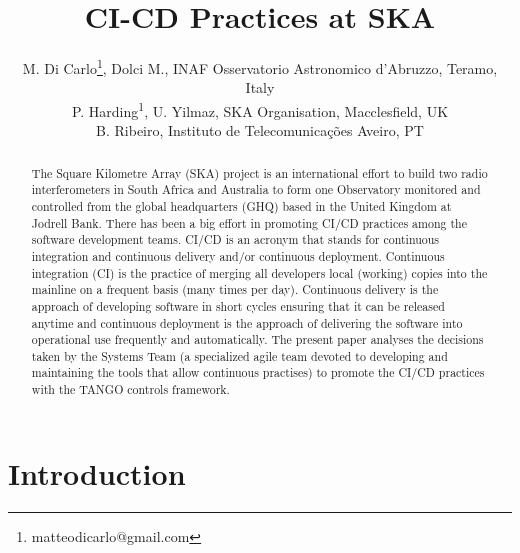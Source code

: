 \documentclass[a4paper,
               keeplastbox,   %
               ]{jacow}
\begin{document}
\title{CI-CD Practices at SKA}

\author{M. Di Carlo\thanks{matteodicarlo@gmail.com}, Dolci M., INAF Osservatorio Astronomico d'Abruzzo, Teramo, Italy \\
        P. Harding\textsuperscript{1}, U. Yilmaz, SKA Organisation, Macclesfield, UK \\
        B. Ribeiro, Instituto de Telecomunicações Aveiro, PT}

\maketitle

\begin{abstract}
The Square Kilometre Array (SKA) project is an international effort to build two radio interferometers in South Africa and Australia to form one Observatory monitored and controlled from the global headquarters (GHQ) based in the United Kingdom at Jodrell Bank. There has been a big effort in promoting CI/CD practices among the software development teams. CI/CD is an acronym that stands for continuous integration and continuous delivery and/or continuous deployment. Continuous integration (CI) is the practice of merging all developers local (working) copies into the mainline on a frequent basis (many times per day). Continuous delivery is the approach of developing software in short cycles ensuring that it can be released anytime and continuous deployment is the approach of delivering the software into operational use frequently and automatically. The present paper analyses the decisions taken by the Systems Team (a specialized agile team devoted to developing and maintaining the tools that allow continuous practises) to promote the CI/CD practices with the TANGO controls framework.
\end{abstract}

\section{Introduction}
\label{sec:intro}  %
\end{document}
